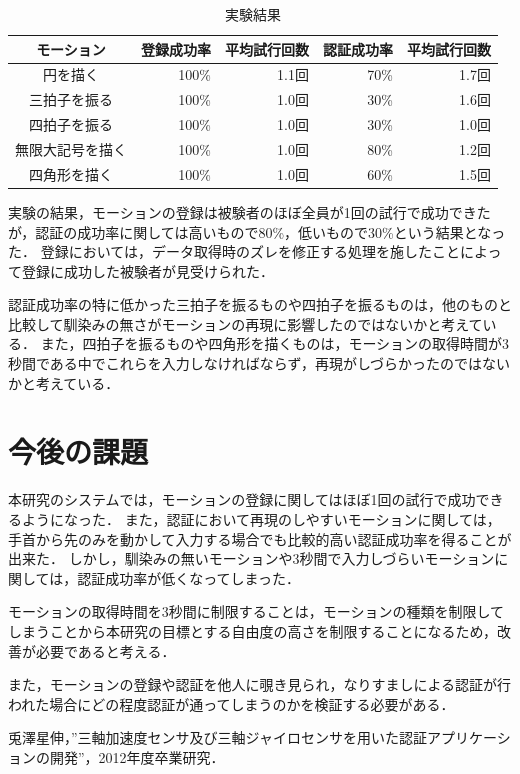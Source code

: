\documentclass[11pt]{jarticle}
\begin{document}
\begin{table}[htb]
    \begin{center}
        \caption{実験結果}
        \label{result}
        \begin{tabular}{|c|r|r||r|r|} \hline
            モーション & 登録成功率 & 平均試行回数 & 認証成功率 & 平均試行回数 \\ \hline \hline
            円を描く & 100\% & 1.1回 & 70\% & 1.7回 \\ \hline
            三拍子を振る & 100\% & 1.0回 & 30\% & 1.6回 \\ \hline
            四拍子を振る & 100\% & 1.0回 & 30\% & 1.0回 \\ \hline
            無限大記号を描く & 100\% & 1.0回 & 80\% & 1.2回 \\ \hline
            四角形を描く & 100\% & 1.0回 & 60\% & 1.5回 \\ \hline
        \end{tabular}
    \end{center}
\end{table}

実験の結果，モーションの登録は被験者のほぼ全員が1回の試行で成功できたが，認証の成功率に関しては高いもので80\%，低いもので30\%という結果となった．
登録においては，データ取得時のズレを修正する処理を施したことによって登録に成功した被験者が見受けられた．

認証成功率の特に低かった三拍子を振るものや四拍子を振るものは，他のものと比較して馴染みの無さがモーションの再現に影響したのではないかと考えている．
また，四拍子を振るものや四角形を描くものは，モーションの取得時間が3秒間である中でこれらを入力しなければならず，再現がしづらかったのではないかと考えている．

\section{今後の課題}
本研究のシステムでは，モーションの登録に関してはほぼ1回の試行で成功できるようになった．
また，認証において再現のしやすいモーションに関しては，手首から先のみを動かして入力する場合でも比較的高い認証成功率を得ることが出来た．
しかし，馴染みの無いモーションや3秒間で入力しづらいモーションに関しては，認証成功率が低くなってしまった．

モーションの取得時間を3秒間に制限することは，モーションの種類を制限してしまうことから本研究の目標とする自由度の高さを制限することになるため，改善が必要であると考える．

また，モーションの登録や認証を他人に覗き見られ，なりすましによる認証が行われた場合にどの程度認証が通ってしまうのかを検証する必要がある．

\begin{thebibliography}{9}
    兎澤星伸，”三軸加速度センサ及び三軸ジャイロセンサを用いた認証アプリケーションの開発”，2012年度卒業研究．
\end{thebibliography}
\end{document}
